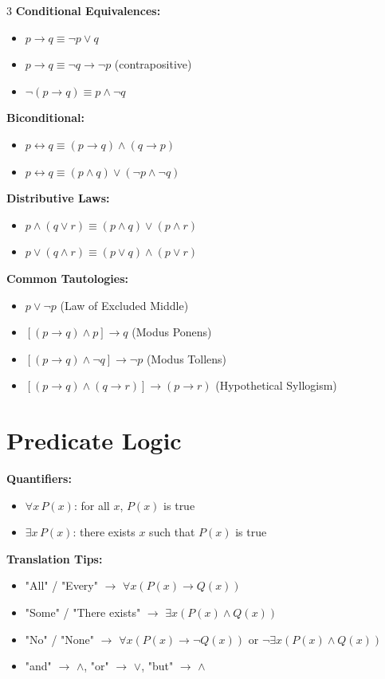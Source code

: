 \documentclass[8pt]{article}
\begin{document}
\begin{multicols}{3}
\textbf{Conditional Equivalences:}
\begin{itemize}[nosep]
\item $p \to q \equiv \neg p \lor q$
\item $p \to q \equiv \neg q \to \neg p$ (contrapositive)
\item $\neg(p \to q) \equiv p \land \neg q$
\end{itemize}

\textbf{Biconditional:}
\begin{itemize}[nosep]
\item $p \leftrightarrow q \equiv (p \to q) \land (q \to p)$
\item $p \leftrightarrow q \equiv (p \land q) \lor (\neg p \land \neg q)$
\end{itemize}

\textbf{Distributive Laws:}
\begin{itemize}[nosep]
\item $p \land (q \lor r) \equiv (p \land q) \lor (p \land r)$
\item $p \lor (q \land r) \equiv (p \lor q) \land (p \lor r)$
\end{itemize}

\textbf{Common Tautologies:}
\begin{itemize}[nosep]
\item $p \lor \neg p$ (Law of Excluded Middle)
\item $[(p \to q) \land p] \to q$ (Modus Ponens)
\item $[(p \to q) \land \neg q] \to \neg p$ (Modus Tollens)
\item $[(p \to q) \land (q \to r)] \to (p \to r)$ (Hypothetical Syllogism)
\end{itemize}

\section*{Predicate Logic}
\textbf{Quantifiers:}
\begin{itemize}[nosep]
\item $\forall x\, P(x)$: for all $x$, $P(x)$ is true
\item $\exists x\, P(x)$: there exists $x$ such that $P(x)$ is true
\end{itemize}

\textbf{Translation Tips:}
\begin{itemize}[nosep]
\item "All" / "Every" $\to$ $\forall x (P(x) \to Q(x))$
\item "Some" / "There exists" $\to$ $\exists x (P(x) \land Q(x))$
\item "No" / "None" $\to$ $\forall x (P(x) \to \neg Q(x))$ or $\neg \exists x (P(x) \land Q(x))$
\item "and" $\to$ $\land$, "or" $\to$ $\lor$, "but" $\to$ $\land$
\end{itemize}


\end{multicols}
\end{document}
